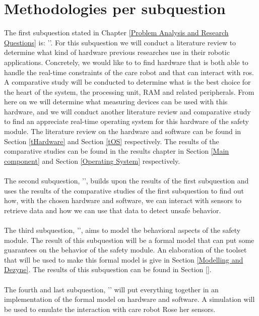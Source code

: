 \documentclass[12pt]{scrreprt}
\begin{document}
\section{Methodologies per subquestion}
\label{Methodologies per subquestion}
The first subquestion stated in Chapter \ref{Problem Analysis and Research Questions} is: '\sqone'. For this subquestion we will conduct a literature review to determine what kind of hardware previous researches use in their robotic applications. Concretely, we would like to to find hardware that is both able to handle the real-time constraints of the care robot and that can interact with \acrshort{ros}. A comparative study will be conducted to determine what is the best choice for the heart of the system, the processing unit, RAM and related peripherals. From here on we will determine what measuring devices can be used with this hardware, and we will conduct another literature review and comparative study to find an appreciate real-time operating system for this hardware of the safety module. The literature review on the hardware and software can be found in Section \ref{tHardware} and Section \ref{tOS} respectively. The results of the comparative studies can be found in the results chapter in Section \ref{Main component} and Section \ref{Operating System} respectively.
\\\\
The second subquestion, '\sqtwo', builds upon the results of the first subquestion and uses the results of the comparative studies of the first subquestion to find out how, with the chosen hardware and software, we can interact with sensors to retrieve data and how we can use that data to detect unsafe behavior.
\\\\
The third subquestion, '\sqthree', aims to model the behavioral aspects of the safety module. The result of this subquestion will be a formal model that can put some guarantees on the behavior of the safety module. An elaboration of the toolset that will be used to make this formal model is give in Section \ref{Modelling and Dezyne}. The results of this subquestion can be found in Section \ref{}.
\\\\
The fourth and last subquestion, '\sqfour' will put everything together in an implementation of the formal model on hardware and software. A simulation will be used to emulate the interaction with care robot Rose her sensors.
\end{document}
